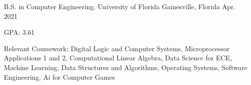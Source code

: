 


\begin{cventries}


\cventry
{B.S. in Computer Engineering.} %
{University of Florida} %
{Gainesville, Florida} %
{Apr. 2021} %
{ %
\begin{cvitems}
\item {GPA: 3.61}
\item Relevant Coursework:
\setlength{\parindent}{.125in}
\newline
Digital Logic and Computer Systems, Microprocessor Applications 1 and 2, Computational Linear Algebra, Data Science for ECE, 
\newline
Machine Learning, Data Structures and Algorithms, Operating Systems, Software Engineering, Ai for Computer Games
\end{cvitems}
}


\end{cventries}
